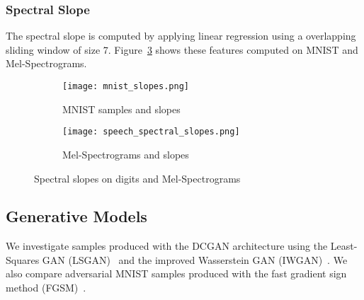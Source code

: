\subsubsection{Spectral Slope}
The spectral slope is computed by applying linear regression using a overlapping
sliding window of size 7. Figure~\ref{fig:slopes} shows these
features computed on MNIST and Mel-Spectrograms. 

\begin{figure}[!h]
    \centering
    \begin{subfigure}[b]{0.4\textwidth}
        \texttt{[image: mnist\_slopes.png]}
        \caption{MNIST samples and slopes}
        \label{fig:mnist_slopes}
    \end{subfigure}
    \quad
    \begin{subfigure}[b]{0.4\textwidth}
        \texttt{[image: speech\_spectral\_slopes.png]}
        \caption{Mel-Spectrograms and slopes}
        \label{fig:spectrogram_slopes}
    \end{subfigure}
    \caption{Spectral slopes on digits and Mel-Spectrograms}
    \label{fig:slopes}
\end{figure}

\subsection{Generative Models}
We investigate samples produced with the DCGAN architecture using the
Least-Squares GAN (LSGAN)~\cite{mao2016least} and the improved Wasserstein
GAN (IWGAN)~\cite{gulrajani2017improved}. We also compare adversarial MNIST
samples produced with the fast gradient sign method
(FGSM)~\cite{goodfellow2014explaining}.
